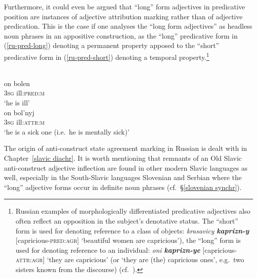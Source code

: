 Furthermore, it could even be argued that “long” form adjectives in predicative position are instances of adjective attribution marking rather than of adjective predication. This is the case if one analyses the “long form adjectives” as headless noun phrases in an appositive construction, as the “long” predicative form in (\ref{ru-pred-long}) denoting a permanent property apposed to the “short” predicative form in (\ref{ru-pred-short}) denoting a temporal property.\footnote{Russian examples of morphologically differentiated predicative adjectives also often reflect an opposition in the subject's denotative status. The “short” form is used for denoting reference to a class of objects: \textit{krasavicy \textbf{kaprizn-y}} [capricious-\textsc{pred:agr}] ‘beautiful women are capricious’), the “long” form is used for denoting reference to an individual: \textit{oni \textbf{kaprizn-ye}} [capricious-\textsc{attr:agr}] ‘they are capricious’ (or ‘they are (the) capricious ones’, e.g.~two sisters known from the discourse) (cf.~\citealt[210 Footnote 76]{mendoza2004}).}
\begin{exe}
\ex
{}
\begin{xlist}
\\
\gll on bolen\\
	3\textsc{sg} ill:\textsc{pred:m}\\
\glt	 ‘he is ill’\label{ru-pred-short}
\\
\gll on bol'nyj\\
	3\textsc{sg} ill:\textsc{attr:m}\\
\glt	 ‘he is a sick one (i.e.~he is mentally sick)’\label{ru-pred-long}
\end{xlist}
\end{exe}
The origin of anti-construct state agreement marking in Russian is dealt with in Chapter~\ref{slavic diachr}. It is worth mentioning that remnants of an Old Slavic anti-construct adjective inflection are found in other modern Slavic languages as well, especially in the South-Slavic languages Slovenian and Serbian where the “long” adjective forms occur in definite noun phrases (cf.~\S\ref{slovenian synchr}).

